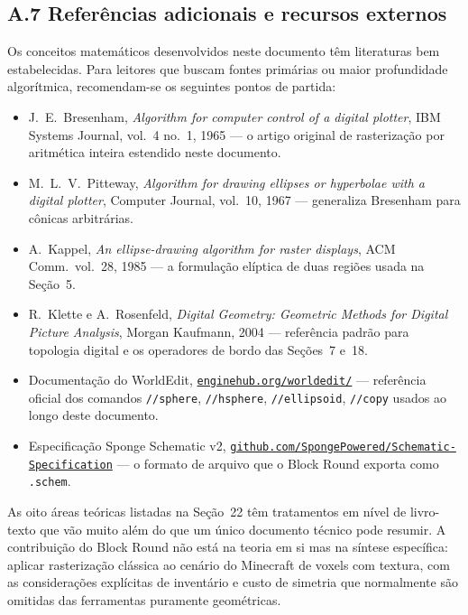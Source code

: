 \documentclass[12pt,a4paper]{scrartcl}
\newcommand{\code}[1]{\texttt{\small #1}}
\newcommand{\cmd}[1]{\textcolor{earth}{\texttt{\small #1}}}
\newcommand{\biblink}[2]{\href{#1}{\nolinkurl{#2}}}
\begin{document}
\subsection*{A.7 Referências adicionais e recursos externos}

Os conceitos matemáticos desenvolvidos neste documento têm literaturas bem estabelecidas. Para leitores que buscam fontes primárias ou maior profundidade algorítmica, recomendam-se os seguintes pontos de partida:

\begin{itemize}[leftmargin=1.4em,itemsep=0.2em,topsep=0.3em]
  \item J.~E.~Bresenham, \emph{Algorithm for computer control of a digital plotter}, IBM Systems Journal, vol.~4 no.~1, 1965 --- o artigo original de rasterização por aritmética inteira estendido neste documento.
  \item M.~L.~V.~Pitteway, \emph{Algorithm for drawing ellipses or hyperbolae with a digital plotter}, Computer Journal, vol.~10, 1967 --- generaliza Bresenham para cônicas arbitrárias.
  \item A.~Kappel, \emph{An ellipse-drawing algorithm for raster displays}, ACM Comm.\ vol.~28, 1985 --- a formulação elíptica de duas regiões usada na Seção~5.
  \item R.~Klette e A.~Rosenfeld, \emph{Digital Geometry: Geometric Methods for Digital Picture Analysis}, Morgan Kaufmann, 2004 --- referência padrão para topologia digital e os operadores de bordo das Seções~7 e~18.
  \item Documentação do WorldEdit, \biblink{https://enginehub.org/worldedit/}{enginehub.org/worldedit/} --- referência oficial dos comandos \cmd{//sphere}, \cmd{//hsphere}, \cmd{//ellipsoid}, \cmd{//copy} usados ao longo deste documento.
  \item Especificação Sponge Schematic v2, \biblink{https://github.com/SpongePowered/Schematic-Specification}{github.com/SpongePowered/Schematic-Specification} --- o formato de arquivo que o Block Round exporta como \code{.schem}.
\end{itemize}

As oito áreas teóricas listadas na Seção~22 têm tratamentos em nível de livro-texto que vão muito além do que um único documento técnico pode resumir. A contribuição do Block Round não está na teoria em si mas na síntese específica: aplicar rasterização clássica ao cenário do Minecraft de voxels com textura, com as considerações explícitas de inventário e custo de simetria que normalmente são omitidas das ferramentas puramente geométricas.
\end{document}
